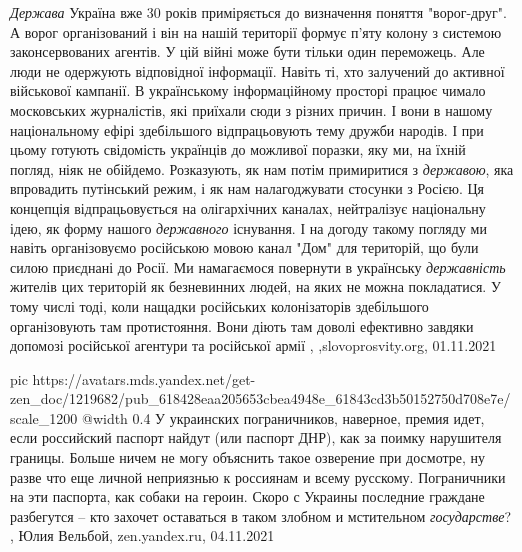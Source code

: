 \emph{Держава} Україна вже 30 років приміряється до визначення поняття
"ворог-друг". А ворог організований і він на нашій території формує п’яту
колону з системою законсервованих агентів. У цій війні може бути тільки один
переможець. Але люди не одержують відповідної інформації. Навіть ті, хто
залучений до активної військової кампанії.  В українському інформаційному
просторі працює чимало московських журналістів, які приїхали сюди з різних
причин. І вони в нашому національному ефірі здебільшого відпрацьовують тему
дружби народів. І при цьому готують свідомість українців до можливої поразки,
яку ми, на їхній погляд, ніяк не обійдемо. Розказують, як нам потім примиритися
з \emph{державою}, яка впровадить путінський режим, і як нам налагоджувати
стосунки з Росією. Ця концепція відпрацьовується на олігархічних каналах,
нейтралізує національну ідею, як форму нашого \emph{державного} існування. І на
догоду такому погляду ми навіть організовуємо російською мовою канал "Дом" для
територій, що були силою приєднані до Росії. Ми намагаємося повернути в
українську \emph{державність} жителів цих територій як безневинних людей, на
яких не можна покладатися. У тому числі тоді, коли нащадки російських
колонізаторів здебільшого організовують там протистояння. Вони діють там доволі
ефективно завдяки допомозі російської агентури та російської армії
, ,slovoprosvity.org, 01.11.2021

\ifcmt
  pic https://avatars.mds.yandex.net/get-zen_doc/1219682/pub_618428eaa205653cbea4948e_61843cd3b50152750d708e7e/scale_1200
  @width 0.4
\fi
У украинских пограничников, наверное, премия идет, если российский паспорт
найдут (или паспорт ДНР), как за поимку нарушителя границы. Больше ничем не
могу объяснить такое озверение при досмотре, ну разве что еще личной неприязнью
к россиянам и всему русскому. Пограничники на эти паспорта, как собаки на
героин. Скоро с Украины последние граждане разбегутся – кто захочет оставаться
в таком злобном и мстительном \emph{государстве}?
, Юлия Вельбой, zen.yandex.ru, 04.11.2021
